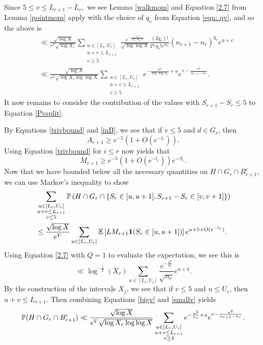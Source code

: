 \documentclass[12pt]{amsart}
\def\P{\ensuremath\mathbb{P}}
\def\E{\ensuremath\mathbb{E}}
\numberwithin{equation}{section}
\numberwithin{thm}{section}
\newcommand{\1}{\mathbf 1}
\begin{document}
Since $5\le v\le L_{r+1}-L_r,$ we see Lemma \ref{walkmom} and Equation \eqref{2.7} from Lemma \ref{pointmom} apply with the choice of $q_v$ from Equation \eqref{eqn: qv}, and so the above is 
\begin{align}
	&\nonumber\ll \frac{\sqrt{\log X}}{e^V\sqrt{\log X_r}}\sum_{\substack{u\in [L_r,U_r]\\ u+v \le L_{r+1}\\ v\ge 5}}\frac{e^{-\frac{u^2}{\log \log X_r}}}{\sqrt{\log\log X}} \frac{(2q_v)!}{2^{q_v}q_v!v^{2q_v}}\left(n_{r+1}-n_{r}\right)^{q_v}e^{u+v}\\
	&\label{bigv}\ll  \frac{\sqrt{\log X}}{e^V\sqrt{\log X_r \log\log X}}\sum_{\substack{u\in [L_r,U_r]\\ u+v \le L_{r+1} \\ v\ge 5}}e^{-\frac{u^2}{\log \log X_r}+u}e^{v-\frac{v^2}{n_{r+1}-n_{r}}}.
\end{align}
It now remains to consider the contribution of the values with $S_{{r+1}}-S_{r}\le 5$ to Equation \eqref{Pvsplit}.

By Equations \eqref{trivbound} and \eqref{inB}, we see that if $v\le 5$ and  $d\in G_r$, then\begin{equation}A_{r+1}\ge e^{-5}\left(1+O\left(e^{-l_r}\right)\right).\end{equation}
Using Equation \eqref{trivbound} for $i\le r$ now yields that
\begin{equation}
	M_{r+1}\ge e^{-5}(1+O(e^{-l_r}))e^{-S_{r}}.
\end{equation}
Now that we have bounded below all the necessary quantities on $H\cap G_r\cap B_{r+1}^c$, we can use Markov's inequality to show \begin{align}\nonumber
	 &\sum_{\substack{u\in [L_r,U_r]\\ u+v \le L_{r+1}\\v\le 5}}\P\left(H\cap G_r\cap\{S_{r}\in [u,u+1], S_{{r+1}}-S_{r}\in [v,v+1]\}	
	\right)\\&\le \frac{\sqrt{\log X}}{e^V}\sum_{u\in [L_r,U_r]}\E\left[LM_{r+1}\mathbf{1}(S_{r}\in [u,u+1])\right]e^{u+5+O(e^{-l_r})}.
\end{align}
Using Equation \eqref{2.7} with $Q=1$ to evaluate the expectation, we see this is 
\begin{equation}
\label{smallv}\ll \log^{-\frac{1}{2}}(X_r) \sum_{u\in [L_r,U_r]}\frac{e^{-\frac{u^2}{n_r}}}{\sqrt{n_r}}e^{u+4}.
\end{equation}
By the construction of the intervals $X_j$, we see that if $v\le 5$ and $u\le U_r$, then $u+v\le L_{r+1}.$ Then combining Equations \eqref{bigv} and \eqref{smallv} yields 
\begin{equation}
	\P(H\cap G_r\cap B_{r+1}^c)\ll  \frac{\sqrt{\log X}}{e^V\sqrt{\log X_r\log\log X}}\sum_{\substack{u\in [L_r,U_r]\\ u+v \le L_{r+1} \\ v\ge 4}}e^{-\frac{u^2}{n_r}+u}e^{v-\frac{v^2}{n_{r+1}-n_{r}}}.
\end{equation}
\end{document}
